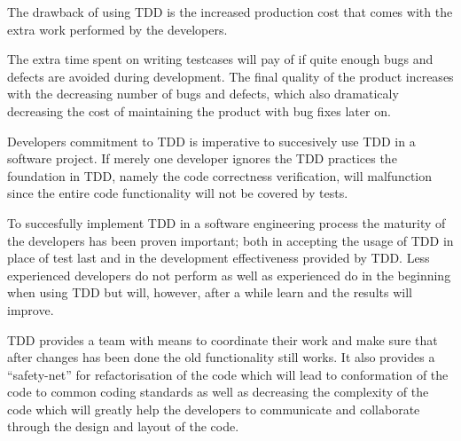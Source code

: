 The drawback of using TDD is the increased production cost that comes with the extra work performed by the developers.

The extra time spent on writing testcases will pay of if quite enough bugs and defects are avoided during development. The final quality of the product increases with the decreasing number of bugs and defects, which also dramaticaly decreasing the cost of maintaining the product with bug fixes later on.

Developers commitment to TDD is imperative to succesively use TDD in a software project. If merely one developer ignores the TDD practices the foundation in TDD, namely the code correctness verification, will malfunction since the entire code functionality will not be covered by tests.

To succesfully implement TDD in a software engineering process the maturity of the developers has been proven important; both in accepting the usage of TDD in place of test last and in the development effectiveness provided by TDD.
Less experienced developers do not perform as well as experienced do in the beginning when using TDD but will, however, after a while learn and the results will improve.

TDD provides a team with means to coordinate their work and make sure that after changes has been done the old functionality still works. It also provides a ``safety-net'' for refactorisation of the code which will lead to conformation of the code to common coding standards as well as decreasing the complexity of the code which will  greatly help the developers to communicate and collaborate through the design and layout of the code.